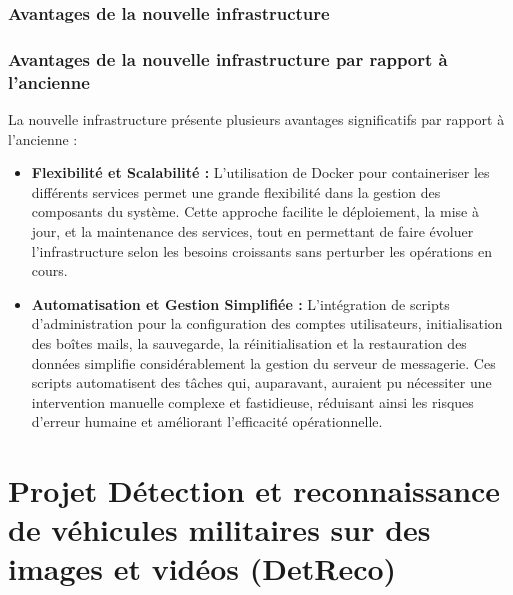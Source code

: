 \subsubsection{Avantages de la nouvelle infrastructure}
\subsubsection{Avantages de la nouvelle infrastructure par rapport à l'ancienne}

La nouvelle infrastructure présente plusieurs avantages significatifs par rapport à l'ancienne :

\begin{itemize}
	\item \textbf{Flexibilité et Scalabilité :} L'utilisation de Docker pour containeriser les différents services permet une grande flexibilité dans la gestion des composants du système. Cette approche facilite le déploiement, la mise à jour, et la maintenance des services, tout en permettant de faire évoluer l'infrastructure selon les besoins croissants sans perturber les opérations en cours.
	\item \textbf{Automatisation et Gestion Simplifiée :} L'intégration de scripts d'administration pour la configuration des comptes utilisateurs, initialisation des boîtes mails, la sauvegarde, la réinitialisation et la restauration des données simplifie considérablement la gestion du serveur de messagerie. Ces scripts automatisent des tâches qui, auparavant, auraient pu nécessiter une intervention manuelle complexe et fastidieuse, réduisant ainsi les risques d'erreur humaine et améliorant l'efficacité opérationnelle.
\end{itemize}































\section{Projet Détection et reconnaissance de véhicules militaires sur des images et vidéos (DetReco)}


